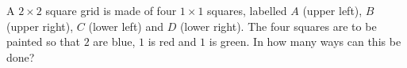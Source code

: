 A $2\times2$ square grid is made of four $1\times1$ squares, labelled $A$ (upper left), $B$ (upper right), $C$ (lower left) and $D$ (lower right). The four squares are to be painted so that $2$ are blue, $1$ is red and $1$ is green. In how many ways can this be done?
